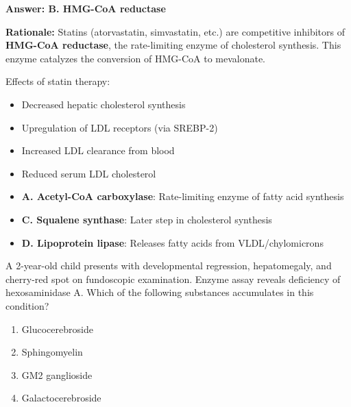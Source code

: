 \begin{solution}
\textbf{Answer: B. HMG-CoA reductase}

\textbf{Rationale:} Statins (atorvastatin, simvastatin, etc.) are competitive inhibitors of \textbf{HMG-CoA reductase}, the rate-limiting enzyme of cholesterol synthesis. This enzyme catalyzes the conversion of HMG-CoA to mevalonate.

Effects of statin therapy:
\begin{itemize}
    \item Decreased hepatic cholesterol synthesis
    \item Upregulation of LDL receptors (via SREBP-2)
    \item Increased LDL clearance from blood
    \item Reduced serum LDL cholesterol
\end{itemize}

\begin{itemize}
    \item \textbf{A. Acetyl-CoA carboxylase}: Rate-limiting enzyme of fatty acid synthesis
    \item \textbf{C. Squalene synthase}: Later step in cholesterol synthesis
    \item \textbf{D. Lipoprotein lipase}: Releases fatty acids from VLDL/chylomicrons
\end{itemize}
\end{solution}

\begin{exercise}
A 2-year-old child presents with developmental regression, hepatomegaly, and cherry-red spot on fundoscopic examination. Enzyme assay reveals deficiency of hexosaminidase A. Which of the following substances accumulates in this condition?
\begin{enumerate}[label=\Alph*.]
    \item Glucocerebroside
    \item Sphingomyelin
    \item GM2 ganglioside
    \item Galactocerebroside
\end{enumerate}
\end{exercise}

